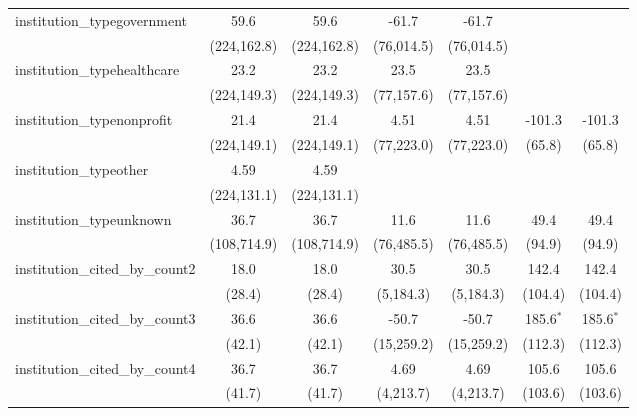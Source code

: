 \begin{tabular}{lcccccc}
   institution\_typegovernment           & 59.6         & 59.6         & -61.7        & -61.7        &             &   \\   
                                         & (224,162.8)  & (224,162.8)  & (76,014.5)   & (76,014.5)   &             &   \\   
   institution\_typehealthcare           & 23.2         & 23.2         & 23.5         & 23.5         &             &   \\   
                                         & (224,149.3)  & (224,149.3)  & (77,157.6)   & (77,157.6)   &             &   \\   
   institution\_typenonprofit            & 21.4         & 21.4         & 4.51         & 4.51         & -101.3      & -101.3\\   
                                         & (224,149.1)  & (224,149.1)  & (77,223.0)   & (77,223.0)   & (65.8)      & (65.8)\\   
   institution\_typeother                & 4.59         & 4.59         &              &              &             &   \\   
                                         & (224,131.1)  & (224,131.1)  &              &              &             &   \\   
   institution\_typeunknown              & 36.7         & 36.7         & 11.6         & 11.6         & 49.4        & 49.4\\   
                                         & (108,714.9)  & (108,714.9)  & (76,485.5)   & (76,485.5)   & (94.9)      & (94.9)\\   
   institution\_cited\_by\_count2        & 18.0         & 18.0         & 30.5         & 30.5         & 142.4       & 142.4\\   
                                         & (28.4)       & (28.4)       & (5,184.3)    & (5,184.3)    & (104.4)     & (104.4)\\   
   institution\_cited\_by\_count3        & 36.6         & 36.6         & -50.7        & -50.7        & 185.6$^{*}$ & 185.6$^{*}$\\   
                                         & (42.1)       & (42.1)       & (15,259.2)   & (15,259.2)   & (112.3)     & (112.3)\\   
   institution\_cited\_by\_count4        & 36.7         & 36.7         & 4.69         & 4.69         & 105.6       & 105.6\\   
                                         & (41.7)       & (41.7)       & (4,213.7)    & (4,213.7)    & (103.6)     & (103.6)\\   

\end{tabular}
